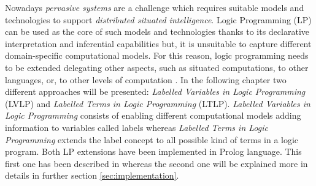 Nowadays \textit{pervasive systems} are a challenge which requires suitable models and technologies to support
\textit{distributed situated intelligence}. Logic Programming (LP) can be used as the core of such models and technologies thanks to its declarative interpretation and inferential capabilities
but, it is unsuitable to capture different domain-specific computational models. For this reason, logic programming needs
to be extended delegating other aspects, such as situated computations, to other languages, or, to other levels of computation \cite{10.3233/FI-2018-1695}.\newline
In the following chapter two different approaches will be presented: \textit{Labelled Variables in Logic Programming} (LVLP) and
\textit{Labelled Terms in Logic Programming} (LTLP).\newline\newline
\textit{Labelled Variables in Logic Programming} consists of enabling different computational models adding information to variables called {labels}
whereas \textit{Labelled Terms in Logic Programming} extends the label concept to all possible kind of terms in a logic program.\newline\newline
Both LP extensions have been implemented in Prolog language. This first one has been described in \cite{10.3233/FI-2018-1695} whereas the second one will be explained more in details in further section \ref{sec:implementation}.